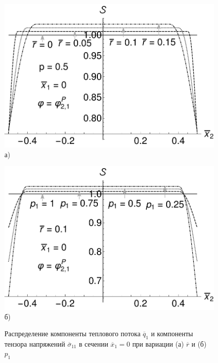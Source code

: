 \begin{figure}[ht]
    \hfill
    \begin{minipage}[b][][b]{0.4\linewidth}\centering
        \includegraphics[width=\linewidth]{pics/HeatFluxStabilityVariationR.pdf} \\ а)
    \end{minipage}
    \hfill
    \begin{minipage}[b][][b]{0.4\linewidth}\centering
        \includegraphics[width=\linewidth]{pics/HeatFluxStabilityVariationP1.pdf} \\ б)
    \end{minipage}
    \hfill
    \caption{Распределение компоненты теплового потока $\overline{q}_1$ и компоненты тензора напряжений $\overline{\sigma}_{11}$ в сечении $\overline{x}_1 = 0$ при вариации (а) $\overline{r}$ и (б) $p_1$}
    \label{fig:SaintVenantVariation}
\end{figure}

